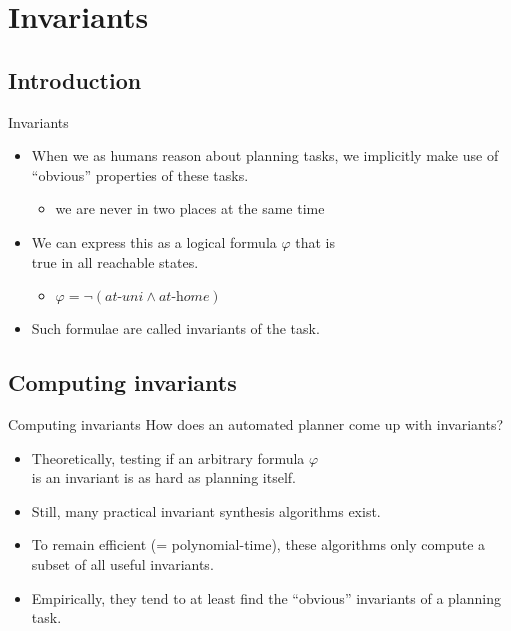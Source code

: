 \documentclass{gkibeamer}
\begin{document}
\subtitle{Interlude: Finite-domain representation}
\date{December 6th, 2011}
\maketitles

\section{Invariants}

\subsection{Introduction}

\begin{frame}{Invariants}
  \begin{itemize}
  \item When we as humans reason about planning tasks, we implicitly
    make use of ``obvious'' properties of these tasks.
    \begin{itemize}
    \item {} we are never in two places at the same
      time
    \end{itemize}
  \item We can express this as a logical formula $\varphi$ that is
    \\ \alert{true in all reachable states}.
    \begin{itemize}
    \item {} $\varphi = \neg (\textit{at-uni} \land
      \textit{at-home})$
    \end{itemize}
  \item Such formulae are called \alert{invariants} of the task.
  \end{itemize}
\end{frame}

\subsection{Computing invariants}

\begin{frame}{Computing invariants}
  How does an \alert{automated} planner come up with invariants?
  \begin{itemize}
  \item Theoretically, testing if an arbitrary formula $\varphi$ \\
    is an invariant is \alert{as hard as planning} itself.
  \item Still, many practical invariant synthesis algorithms exist.
  \item To remain efficient (= polynomial-time), these algorithms only
    compute a \alert{subset} of all useful invariants.
  \item Empirically, they tend to at least find the ``obvious''
    invariants of a planning task.
  \end{itemize}
\end{frame}
\end{document}

